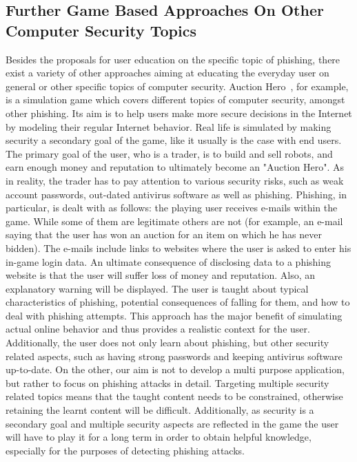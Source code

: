 \subsection{Further Game Based Approaches On Other Computer Security Topics}
Besides the proposals for user education on the specific topic of phishing, there exist a variety of other approaches aiming at educating the everyday user on general or other specific topics of computer security.
Auction Hero~\cite{chiasson2011auction}, for example, is a simulation game which covers different topics of computer security, amongst other phishing. 
Its aim is to help users make more secure decisions in the Internet by modeling their regular Internet behavior. 
Real life is simulated by making security a secondary goal of the game, like it usually is the case with end users. 
The primary goal of the user, who is a trader, is to build and sell robots, and earn enough money and reputation to ultimately become an "Auction Hero". 
As in reality, the trader has to pay attention to various security risks, such as weak account passwords, out-dated antivirus software as well as phishing. 
Phishing, in particular, is dealt with as follows: the playing user receives e-mails within the game. While some of them are legitimate others are not (for example, an e-mail saying that the user has won an auction for an item on which he has never bidden). 
The e-mails include links to websites where the user is asked to enter his in-game login data. 
An ultimate consequence of disclosing data to a phishing website is that the user will suffer loss of money and reputation. 
Also, an explanatory warning will be displayed. 
The user is taught about typical characteristics of phishing, potential consequences of falling for them, and how to deal with phishing attempts. 
This approach has the major benefit of simulating actual online behavior and thus provides a realistic context for the user. 
Additionally, the user does not only learn about phishing, but other security related aspects, such as having strong passwords and keeping antivirus software up-to-date. 
On the other, our aim is not to develop a multi purpose application, but rather to focus on phishing attacks in detail.
Targeting multiple security related topics means that the taught content needs to be constrained, otherwise retaining the learnt content will be difficult.
Additionally, as security is a secondary goal and multiple security aspects are reflected in the game the user will have to play it for a long term in order to obtain helpful knowledge, especially for the purposes of detecting phishing attacks.
